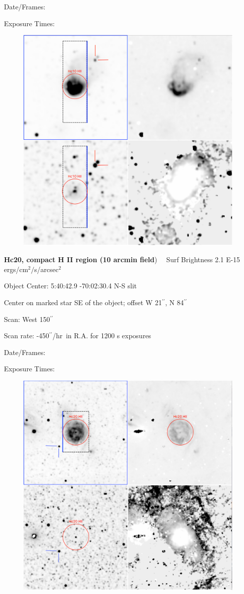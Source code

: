 \documentclass[11pt]{article}
\newcommand{\arcsec}{$^{\prime\prime}$}
\begin{document}
Date/Frames:

Exposure Times:  

\begin{figure}
\includegraphics[width=12.5cm]{snapshots/Hc10_HII.png}
\end{figure}

\newpage 
 
{\bf Hc20, compact H II region (10 arcmin field})   \ \   Surf Brightness 2.1 E-15 ergs/cm$^2/$s/arcsec$^2$

Object Center:  5:40:42.9    -70:02:30.4   N-S slit

Center on marked star SE of the object; offset W 21\arcsec,  N 84\arcsec

Scan:    West 150\arcsec

Scan rate:  -450\arcsec/hr\ in R.A. for 1200 s exposures

Date/Frames:

Exposure Times:  

\begin{figure}
\includegraphics[width=12.5cm]{snapshots/Hc20_HII.png}
\end{figure}
\end{document}
